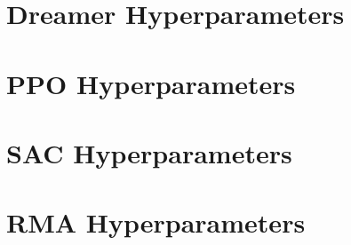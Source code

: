\newpage

\section{Dreamer Hyperparameters}



\section{PPO Hyperparameters}



\section{SAC Hyperparameters}



\section{RMA Hyperparameters}


